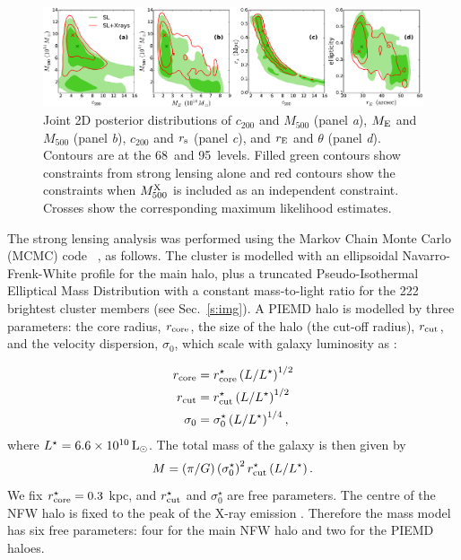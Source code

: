 \begin{figure}
 \centerline{\includegraphics[width=\textwidth]{chapter2/sl-contours.pdf}}
\caption{Joint 2D posterior distributions of $c_{200}$ and $M_{500}$ (panel {\it a}), $M_{\rm E}$ and 
$M_{500}$ (panel {\it b}), $c_{200}$ and $r_{\rm s}$ (panel {\it c}), and $r_{\rm E}$ and $\theta$ (panel {\it 
d}). Contours are at the 68\percent\ and 95\percent\ levels. Filled green contours show constraints from strong 
lensing alone and red contours show the constraints when $M_{500}^{\rm X}$ is included as an independent 
constraint. Crosses show the corresponding maximum likelihood estimates.}
\label{f:contours}
\end{figure}


The strong lensing analysis was performed using the Markov Chain Monte Carlo (MCMC) code \lenstool\
\citep{kneib93,jullo07}, as follows. The cluster is modelled with an ellipsoidal Navarro-Frenk-White
\citep[NFW,][]{nfw95} profile for the main halo, plus a truncated Pseudo-Isothermal Elliptical Mass
Distribution \citep[PIEMD,][]{kassiola93,kneib96} with a constant mass-to-light ratio for the 222
brightest cluster members (see Sec.~\ref{s:img}). A PIEMD halo is modelled by three parameters: the
core radius, $r_{\rm core}$, the size of the halo (the cut-off radius), $r_{\rm cut}$, and the
velocity dispersion, $\sigma_0$, which scale with galaxy luminosity as \citep{jullo07}:

\begin{subequations}\label{eq:piemd}
\begin{align}
 r_{\rm core} &= r^\star_{\rm core} \left(L/L^{\star}\right)^{1/2} \\
  r_{\rm cut} &= r^\star_{\rm cut} \left(L/L^{\star}\right)^{1/2} \\
     \sigma_0 &= \sigma^\star_0 \left(L/L^{\star}\right)^{1/4},
\end{align}
\end{subequations}
where $L^\star=6.6\times10^{10}\,{\rm L}_\odot$. The total mass of the galaxy is then given by
\begin{equation}
 M = \left(\pi/G\right) \left(\sigma^\star_0\right)^2 r^\star_{\rm cut} \left(L/L^{\star}\right).
\end{equation}
We fix $r^\star_{\rm core}=0.3$ kpc, and $r^\star_{\rm cut}$ and $\sigma^{\star}_0$ are free
parameters. The centre of the NFW halo is fixed to the peak of the X-ray emission 
\citep[located at RA=19:17:04.6, Dec=$-$33:31:21.9;][]{planck11ix}. Therefore the mass model 
has six free 
parameters: four for the main NFW halo and two for the PIEMD haloes.%

